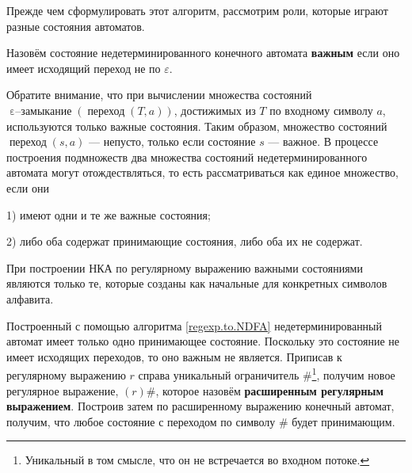 \documentclass[10pt]{report}
\newcommand{\epsclos}{\mathop{\text{$\varepsilon$--замыкание}}}
\newcommand{\move}{\mathop{\text{переход}}}
\begin{document}
Прежде чем сформулировать этот алгоритм, рассмотрим роли, которые играют разные состояния автоматов.

Назовём состояние недетерминированного конечного автомата \textbf{важным} если оно имеет исходящий переход не по $\varepsilon$. 

Обратите внимание, что при вычислении
множества состояний $\epsclos(\move(T,a))$, достижимых из $T$ по входному символу $a$, используются только важные состояния. Таким образом, множество состояний $\move(s,a)$
--- непусто, только если состояние $s$ --- важное. В процессе построения подмножеств два множества состояний недетерминированного автомата могут отождествляться, то есть
рассматриваться как единое множество, если они

1) имеют одни и те же важные состояния;

2) либо оба содержат принимающие состояния, либо оба их не содержат.

При построении НКА по регулярному выражению важными состояниями являются только те, которые созданы как начальные для конкретных символов алфавита.

Построенный с помощью алгоритма \ref{regexp.to.NDFA} недетерминированный автомат имеет только одно принимающее состояние. Поскольку это состояние не имеет исходящих
переходов, то оно важным не является. Приписав к регулярному выражению $r$ справа уникальный ограничитель $\#$\footnote{\small Уникальный в том смысле, что он не встречается
во входном потоке.}, получим новое регулярное выражение, $(r)\#$, которое назовём \textbf{расширенным регулярным выражением}. Построив затем по расширенному выражению
конечный автомат, получим, что любое состояние с переходом по символу $\#$ будет принимающим.
\end{document}

